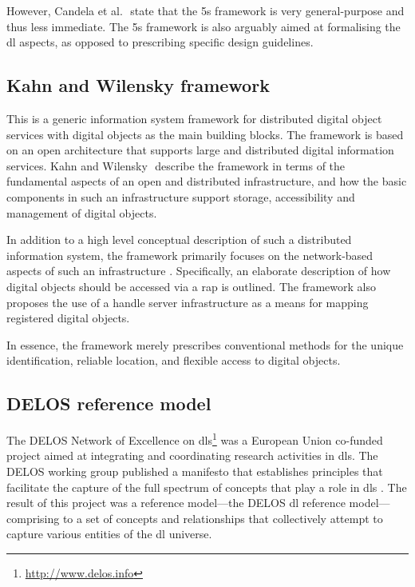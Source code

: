However, Candela et al. \citep{Candela2007}⁠ state that the \gls{5s} framework is very general-purpose and thus less immediate. The \gls{5s} framework is also arguably aimed at formalising the \gls{dl} aspects, as opposed to prescribing specific design guidelines.

\subsection[Kahn\& Wilensky framework]{Kahn and Wilensky framework}
\label{sec:background:reference-models-frameworks:kahn-wilensky}

This is a generic information system framework for distributed digital object services with digital objects as the main building blocks. The framework is based on an open architecture that supports large and distributed digital information services. Kahn and Wilensky \citep{Kahn2006}⁠ describe the framework in terms of the fundamental aspects of an open and distributed infrastructure, and how the basic components in such an infrastructure support storage, accessibility and management of digital objects.

In addition to a high level conceptual description of such a distributed information system, the framework primarily focuses on the network-based aspects of such an infrastructure \citep{Kahn2006}. Specifically, an elaborate description of how digital objects should be accessed via a \gls{rap} is outlined. The framework also proposes the use of a handle server infrastructure as a means for mapping registered digital objects.

In essence, the framework merely prescribes conventional methods for the unique identification, reliable location, and flexible access to digital objects.

\subsection{DELOS reference model}
\label{sec:background:reference-models-frameworks:delos}

The DELOS Network of Excellence on \glspl{dl}\footnote{\url{http://www.delos.info}} was a European Union co-funded project aimed at integrating and coordinating research activities in \glspl{dl}. The DELOS working group published a manifesto that establishes principles that facilitate the capture of the full spectrum of concepts that play a role in \glspl{dl} \citep{Candela2007a}⁠. The result of this project was a reference model---the DELOS \gls{dl} reference model---comprising to a set of concepts and relationships that collectively attempt to capture various entities of the \gls{dl} universe.

